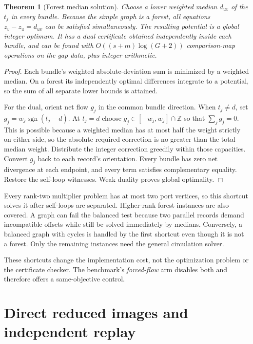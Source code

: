 \documentclass[11pt,letterpaper]{article}
\newtheorem{theorem}{Theorem}[section]
\theoremstyle{definition}
\theoremstyle{remark}\newtheorem{remark}[theorem]{Remark}
\newcommand{\Z}{\mathbb Z}
\newcommand{\sgn}{\operatorname{sgn}}
\begin{document}
\begin{theorem}[Forest median solution]
Choose a lower weighted median $d_{uv}$ of the $t_j$ in every bundle.
Because the simple graph is a forest, all equations
$z_v-z_u=d_{uv}$ can be satisfied simultaneously. The resulting potential is
a global integer optimum. It has a dual certificate obtained independently
inside each bundle, and can be found with $O((s+m)\log(G+2))$ comparison-map
operations on the gap data, plus integer arithmetic.
\end{theorem}
\begin{proof}
Each bundle's weighted absolute-deviation sum is minimized by a weighted
median. On a forest its independently optimal differences integrate to a
potential, so the sum of all separate lower bounds is attained.

For the dual, orient net flow $g_j$ in the common bundle direction. When
$t_j\ne d$, set $g_j=w_j\sgn(t_j-d)$. At $t_j=d$ choose
$g_j\in[-w_j,w_j]\cap\Z$ so that $\sum_jg_j=0$. This is possible because a
weighted median has at most half the weight strictly on either side, so the
absolute required correction is no greater than the total median weight.
Distribute the integer correction greedily within those capacities. Convert
$g_j$ back to each record's orientation. Every bundle has zero net divergence
at each endpoint, and every term satisfies complementary equality. Restore
the self-loop witnesses. Weak duality proves global optimality.
\end{proof}

Every rank-two multiplier problem has at most two port vertices, so this
shortcut solves it after self-loops are separated. Higher-rank forest instances
are also covered. A graph can fail the balanced test because two parallel
records demand incompatible offsets while still be solved immediately by
medians. Conversely, a balanced graph with cycles is handled by the first
shortcut even though it is not a forest. Only the remaining instances need
the general circulation solver.

These shortcuts change the implementation cost, not the optimization problem
or the certificate checker. The benchmark's \emph{forced-flow} arm disables
both and therefore offers a same-objective control.

\section{Direct reduced images and independent replay}
\label{sec:output}
\end{document}
